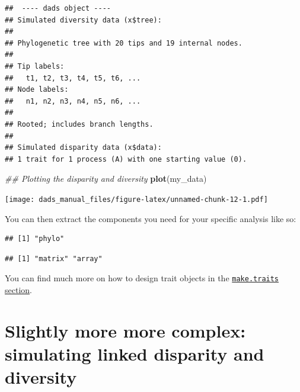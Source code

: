 \documentclass[]{book}
\newenvironment{Shaded}{\begin{snugshade}}{\end{snugshade}}
\newcommand{\CommentTok}[1]{\textcolor[rgb]{0.56,0.35,0.01}{\textit{#1}}}
\newcommand{\KeywordTok}[1]{\textcolor[rgb]{0.13,0.29,0.53}{\textbf{#1}}}
\newcommand{\NormalTok}[1]{#1}
\newcommand{\OperatorTok}[1]{\textcolor[rgb]{0.81,0.36,0.00}{\textbf{#1}}}
\newcommand{\StringTok}[1]{\textcolor[rgb]{0.31,0.60,0.02}{#1}}
\begin{document}
\begin{verbatim}
##  ---- dads object ---- 
## Simulated diversity data (x$tree):
## 
## Phylogenetic tree with 20 tips and 19 internal nodes.
## 
## Tip labels:
##   t1, t2, t3, t4, t5, t6, ...
## Node labels:
##   n1, n2, n3, n4, n5, n6, ...
## 
## Rooted; includes branch lengths.
## 
## Simulated disparity data (x$data):
## 1 trait for 1 process (A) with one starting value (0).
\end{verbatim}

\begin{Shaded}
\begin{Highlighting}[]
\CommentTok{## Plotting the disparity and diversity}
\KeywordTok{plot}\NormalTok{(my_data)}
\end{Highlighting}
\end{Shaded}

\texttt{[image: dads\_manual\_files/figure-latex/unnamed-chunk-12-1.pdf]}

You can then extract the components you need for your specific analysis like so:

\begin{Shaded}
\end{Shaded}

\begin{verbatim}
## [1] "phylo"
\end{verbatim}

\begin{Shaded}
\end{Shaded}

\begin{verbatim}
## [1] "matrix" "array"
\end{verbatim}

You can find much more on how to design trait objects in the \protect\hyperlink{maketraits}{\texttt{make.traits} section}.

\hypertarget{slightly-more-more-complex-simulating-linked-disparity-and-diversity}{%
\section{Slightly more more complex: simulating linked disparity and diversity}\label{slightly-more-more-complex-simulating-linked-disparity-and-diversity}}
\end{document}
